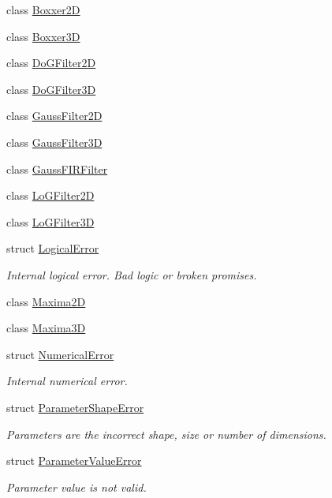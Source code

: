 \begin{DoxyCompactItemize}
\item 
class \hyperlink{classboxxer_1_1Boxxer2D}{Boxxer2D}
\item 
class \hyperlink{classboxxer_1_1Boxxer3D}{Boxxer3D}
\item 
class \hyperlink{classboxxer_1_1DoGFilter2D}{Do\+G\+Filter2D}
\item 
class \hyperlink{classboxxer_1_1DoGFilter3D}{Do\+G\+Filter3D}
\item 
class \hyperlink{classboxxer_1_1GaussFilter2D}{Gauss\+Filter2D}
\item 
class \hyperlink{classboxxer_1_1GaussFilter3D}{Gauss\+Filter3D}
\item 
class \hyperlink{classboxxer_1_1GaussFIRFilter}{Gauss\+F\+I\+R\+Filter}
\item 
class \hyperlink{classboxxer_1_1LoGFilter2D}{Lo\+G\+Filter2D}
\item 
class \hyperlink{classboxxer_1_1LoGFilter3D}{Lo\+G\+Filter3D}
\item 
struct \hyperlink{structboxxer_1_1LogicalError}{Logical\+Error}
\begin{DoxyCompactList}\small\item\em Internal logical error. Bad logic or broken promises. \end{DoxyCompactList}\item 
class \hyperlink{classboxxer_1_1Maxima2D}{Maxima2D}
\item 
class \hyperlink{classboxxer_1_1Maxima3D}{Maxima3D}
\item 
struct \hyperlink{structboxxer_1_1NumericalError}{Numerical\+Error}
\begin{DoxyCompactList}\small\item\em Internal numerical error. \end{DoxyCompactList}\item 
struct \hyperlink{structboxxer_1_1ParameterShapeError}{Parameter\+Shape\+Error}
\begin{DoxyCompactList}\small\item\em Parameters are the incorrect shape, size or number of dimensions. \end{DoxyCompactList}\item 
struct \hyperlink{structboxxer_1_1ParameterValueError}{Parameter\+Value\+Error}
\begin{DoxyCompactList}\small\item\em Parameter value is not valid. \end{DoxyCompactList}\end{DoxyCompactItemize}
